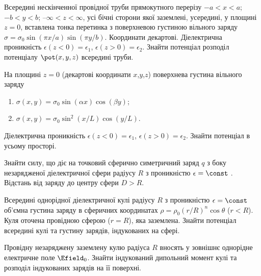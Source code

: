 \begin{problem}
Всередині нескінченної провідної труби прямокутного перерізу $-a<x<a$; $-b<y<b$; $–\infty<z<\infty$, усі бічні сторони якої заземлені, усередині, у площині $z=0$, вставлена тонка перетинка з поверхневою густиною вільного заряду $\sigma  = \sigma _0\sin (\pi x/a)\sin (\pi y/b)$. Координати декартові. Діелектрична проникність  $\epsilon (z < 0) = \epsilon _1$, $\epsilon (z > 0) = \epsilon _2$. Знайти потенціал розподіл потенціалу $\pot(x,y,z)$ всередині труби.
\end{problem}

\begin{problem}
На площині $z=0$ (декартові координати $x$,$y$,$z$) поверхнева густина вільного заряду
\begin{enumerate}[label=\alph*)]
	\item $\sigma (x,y) = \sigma _0\sin (\alpha x)\cos (\beta y)$;
	\item $\sigma (x,y) = {\sigma _0}{\sin ^2}(x/L)\cos (y/L)$.
\end{enumerate}
Діелектрична проникність  $\epsilon (z < 0) = \epsilon _1$, $\epsilon (z > 0) = \epsilon _2$. Знайти потенціал в усьому просторі.
\end{problem}

\begin{problem}
Знайти силу, що діє на точковий сферично симетричний заряд  $q$ з боку незарядженої діелектричної сфери радіусу $R$  з проникністю $\epsilon = \const$ . Відстань від заряду до центру сфери $D > R$.
\end{problem}


\begin{problem}
    Всередині однорідної діелектричної кулі радіусу $R$ з проникністю $\epsilon=\const$  об'ємна густина заряду в сферичних координатах  $\rho = \rho_0(r/R)^n\cos\theta$ ($r<R$). Куля оточена провідною сферою ($r = R$), яка заземлена. Знайти потенціал всередині кулі та густину зарядів, індукованих на сфері.
\end{problem}

\begin{problem}
Провідну незаряджену заземлену кулю  радіуса $R$ вносять у зовнішнє однорідне електричне поле $\Efield_0$. Знайти індукований дипольний момент кулі  та розподіл індукованих зарядів на її поверхні.
\end{problem}

